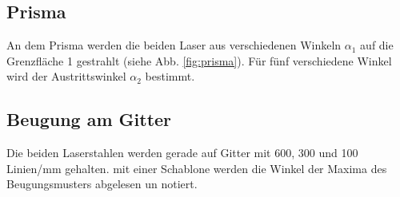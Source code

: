 \subsection{Prisma}
An dem Prisma werden die beiden Laser aus verschiedenen Winkeln $\alpha_1$ auf die Grenzfläche 1 gestrahlt (siehe Abb. \ref{fig:prisma}).
Für fünf verschiedene Winkel wird der Austrittswinkel $\alpha_2$ bestimmt. 


\subsection{Beugung am Gitter}
Die beiden Laserstahlen werden gerade auf Gitter mit \num{600}, \num{300} und \num{100} Linien/\unit{\mm} gehalten.
mit einer Schablone werden die Winkel der Maxima des Beugungsmusters abgelesen un notiert.
